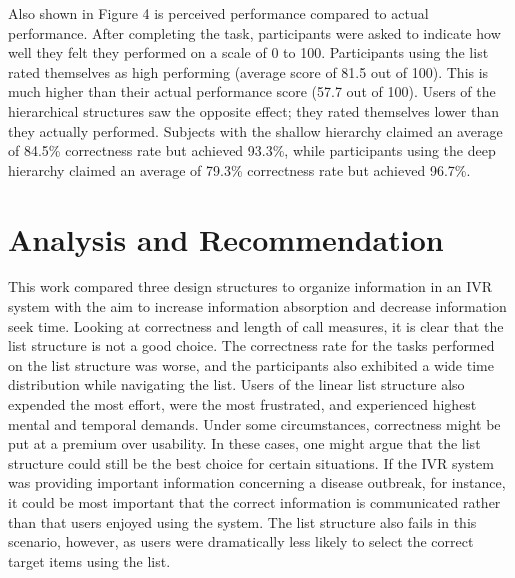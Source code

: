\documentclass{sigchi}
\begin{document}
Also shown in Figure 4 is perceived performance compared to actual performance. After completing the task, participants were asked to indicate how well they felt they performed on a scale of 0 to 100. Participants using the list rated themselves as high performing (average score of 81.5 out of 100). This is much higher than their actual performance score (57.7 out of 100). Users of the hierarchical structures saw the opposite effect; they rated themselves lower than they actually performed. Subjects with the shallow hierarchy claimed an average of 84.5\% correctness rate but achieved 93.3\%, while participants using the deep hierarchy claimed an average of 79.3\% correctness rate but achieved 96.7\%.

\section{Analysis and Recommendation}
This work compared three design structures to organize information in an IVR system with the aim to increase information absorption and decrease information seek time. Looking at correctness and length of call measures, it is clear that the list structure is not a good choice. The correctness rate for the tasks performed on the list structure was worse, and the participants also exhibited a wide time distribution while navigating the list. Users of the linear list structure also expended the most effort, were the most frustrated, and experienced highest mental and temporal demands. Under some circumstances, correctness might be put at a premium over usability. In these cases, one might argue that the list structure could still be the best choice for certain situations. If the IVR system was providing important information concerning a disease outbreak, for instance, it could be most important that the correct information is communicated rather than that users enjoyed using the system. The list structure also fails in this scenario, however, as users were dramatically less likely to select the correct target items using the list.
\end{document}
